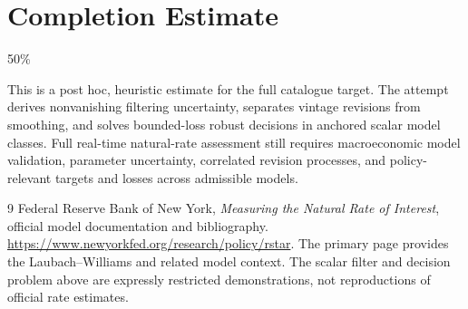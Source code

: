 \documentclass[11pt,a4paper]{article}
\begin{document}
\section{Completion Estimate}
50\%

This is a post hoc, heuristic estimate for the full catalogue target.
The attempt derives nonvanishing filtering uncertainty, separates vintage revisions from smoothing, and solves bounded-loss robust decisions in anchored scalar model classes. Full real-time natural-rate assessment still requires macroeconomic model validation, parameter uncertainty, correlated revision processes, and policy-relevant targets and losses across admissible models.

\begin{thebibliography}{9}
 Federal Reserve Bank of New York, \emph{Measuring the Natural Rate of Interest}, official model documentation and bibliography. \url{https://www.newyorkfed.org/research/policy/rstar}. The primary page provides the Laubach--Williams and related model context. The scalar filter and decision problem above are expressly restricted demonstrations, not reproductions of official rate estimates.
\end{thebibliography}
\end{document}
